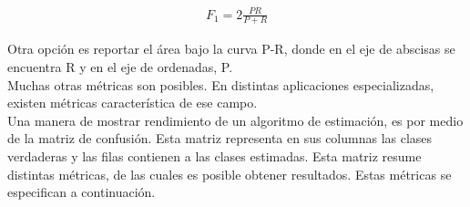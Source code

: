\begin{align}
    F_1 = 2\frac{PR}{P+R}
\end{align}

\indent Otra opción es reportar el área bajo la curva P-R, donde en el eje de abscisas se encuentra R y en el eje de ordenadas, P. \\
\indent Muchas otras métricas son posibles. En distintas aplicaciones especializadas, existen métricas característica de ese campo. \\
\indent Una manera de mostrar rendimiento de un algoritmo de estimación, es por medio de la matriz de confusión. Esta matriz representa en sus columnas las clases verdaderas y las filas contienen a las clases estimadas. Esta matriz resume distintas métricas, de las cuales es posible obtener resultados. Estas métricas se especifican a continuación.

